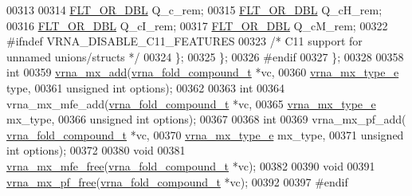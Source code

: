 \begin{DoxyCode}
00313 
00314       \hyperlink{group__data__structures_ga31125aeace516926bf7f251f759b6126}{FLT\_OR\_DBL}      Q\_c\_rem;
00315       \hyperlink{group__data__structures_ga31125aeace516926bf7f251f759b6126}{FLT\_OR\_DBL}      Q\_cH\_rem;
00316       \hyperlink{group__data__structures_ga31125aeace516926bf7f251f759b6126}{FLT\_OR\_DBL}      Q\_cI\_rem;
00317       \hyperlink{group__data__structures_ga31125aeace516926bf7f251f759b6126}{FLT\_OR\_DBL}      Q\_cM\_rem;
00322 \textcolor{preprocessor}{#ifndef VRNA\_DISABLE\_C11\_FEATURES}
00323     \textcolor{comment}{/* C11 support for unnamed unions/structs */}
00324     \};
00325   \};
00326 \textcolor{preprocessor}{#endif}
00327 \};
00328 
00358 \textcolor{keywordtype}{int}
00359 \hyperlink{group__dp__matrices_ga08661f098008961dab0023bf300f0c33}{vrna\_mx\_add}(\hyperlink{group__fold__compound_structvrna__fc__s}{vrna\_fold\_compound\_t} *vc,
00360             \hyperlink{group__dp__matrices_ga6042ea1d58d01931e959791be6d89343}{vrna\_mx\_type\_e} type,
00361             \textcolor{keywordtype}{unsigned} \textcolor{keywordtype}{int} options);
00362 
00363 \textcolor{keywordtype}{int}
00364 vrna\_mx\_mfe\_add(\hyperlink{group__fold__compound_structvrna__fc__s}{vrna\_fold\_compound\_t} *vc,
00365                 \hyperlink{group__dp__matrices_ga6042ea1d58d01931e959791be6d89343}{vrna\_mx\_type\_e} mx\_type,
00366                 \textcolor{keywordtype}{unsigned} \textcolor{keywordtype}{int} options);
00367 
00368 \textcolor{keywordtype}{int}
00369 vrna\_mx\_pf\_add( \hyperlink{group__fold__compound_structvrna__fc__s}{vrna\_fold\_compound\_t} *vc,
00370                 \hyperlink{group__dp__matrices_ga6042ea1d58d01931e959791be6d89343}{vrna\_mx\_type\_e} mx\_type,
00371                 \textcolor{keywordtype}{unsigned} \textcolor{keywordtype}{int} options);
00372 
00380 \textcolor{keywordtype}{void}
00381 \hyperlink{group__dp__matrices_ga6a9422feb5dfe5c64050cebf447672d0}{vrna\_mx\_mfe\_free}(\hyperlink{group__fold__compound_structvrna__fc__s}{vrna\_fold\_compound\_t} *vc);
00382 
00390 \textcolor{keywordtype}{void}
00391 \hyperlink{group__dp__matrices_ga2283e69fd139fb8e58d7ade3b5773f9c}{vrna\_mx\_pf\_free}(\hyperlink{group__fold__compound_structvrna__fc__s}{vrna\_fold\_compound\_t} *vc);
00392 
00397 \textcolor{preprocessor}{#endif}
\end{DoxyCode}
